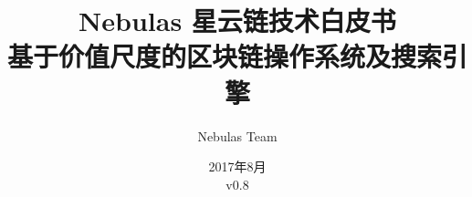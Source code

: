 \documentclass[11.5pt]{article}
\begin{document}
\renewcommand{\contentsname}{目录}
\renewcommand{\abstractname}{摘要}
\renewcommand{\refname}{参考文献}
\renewcommand{\nomname}{术语表}
\renewcommand{\figurename}{图}
\renewcommand{\tablename}{表}
\renewcommand{\baselinestretch}{1.5}
\renewcommand{\appendixname}{附录}

\title{
	Nebulas 星云链技术白皮书 \\
	\large 基于价值尺度的区块链操作系统及搜索引擎}
\author{Nebulas Team}
\date{2017年8月\\v0.8}

\maketitle

\newpage

\tableofcontents

\printnomenclature


\newpage

\newpage

\newpage

\newpage

\newpage

\newpage

\newpage

\newpage

\newpage

\printbibliography

\begin{appendices}


\end{appendices}

%
\end{document}

